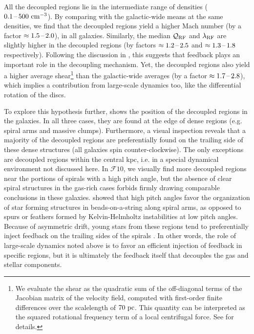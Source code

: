 \documentclass[useAMS,usenatbib]{mnras}
\newcommand{\qrf}{\ensuremath{\mathcal{Q}_{\rm RF}}\xspace}
\newcommand{\lrf}{\ensuremath{\lambda_{\rm RF}}\xspace}
\newcommand{\gs}{\ensuremath{\mathcal{F}10}\xspace}
\begin{document}
All the decoupled regions lie in the intermediate range of densities ($0.1 \textrm{\,--\,} 500 \mathrm{~cm^{-3}}$). By comparing with the galactic-wide means at the same densities, we find that the decoupled regions yield a higher Mach number (by a factor $\approx 1.5\textrm{\,--\,} 2.0$), in all galaxies. Similarly, the median \qrf and \lrf are slightly higher in the decoupled regions (by factors $\approx 1.2\textrm{\,--\,} 2.5$ and $\approx 1.3\textrm{\,--\,} 1.8$ respectively). Following the discussion in , this suggests that feedback plays an important role in the decoupling mechanism. Yet, the decoupled regions also yield a higher average shear\footnote{We evaluate the shear as the quadratic sum of the off-diagonal terms of the Jacobian matrix of the velocity field, computed with first-order finite differences over the scalelength of $70 \mathrm{~pc}$. This quantity can be interpreted as the squared rotational frequency term of a local centrifugal force. See \citet{Renaud2015d} for details.} than the galactic-wide averages (by a factor $\approx 1.7\textrm{\,--\,} 2.8$), which implies a contribution from large-scale dynamics too, like the differential rotation of the discs.

To explore this hypothesis further,  shows the position of the decoupled regions in the galaxies. In all three cases, they are found at the edge of dense regions (e.g. spiral arms and massive clumps). Furthermore, a visual inspection reveals that a majority of the decoupled regions are preferentially found on the trailing side of these dense structures (all galaxies spin counter-clockwise). The only exceptions are decoupled regions within the central kpc, i.e. in a special dynamical environment not discussed here. In \gs, we visually find more decoupled regions near the portions of spirals with a high pitch angle, but the absence of clear spiral structures in the gas-rich cases forbids firmly drawing comparable conclusions in these galaxies. \citet{Renaud2014} showed that high pitch angles favor the organization of star forming structures in beads-on-a-string along spiral arms, as opposed to spurs or feathers formed by Kelvin-Helmholtz instabilities at low pitch angles. Because of asymmetric drift, young stars from these regions tend to preferentially inject feedback on the trailing sides of the spirals \citep[][their figure 14]{Renaud2013b}. In other words, the role of large-scale dynamics noted above is to favor an efficient injection of feedback in specific regions, but it is ultimately the feedback itself that decouples the gas and stellar components.
\end{document}
